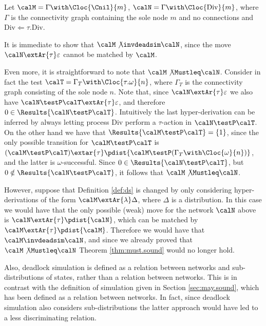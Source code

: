 \documentclass{LMCS}
\begin{document}
\begin{exa}[Divergence]
\label{ex:divergence}
Let $\calM = \Gamma \with \Cloc{\Cnil}{m}$, 
$\calN = \Gamma \with \Cloc{\text{Div}}{m}$, 
where $\Gamma$ is the connectivity graph containing 
the sole node $m$ and no connections and 
$\text{Div} \Leftarrow \tau.\text{Div}$. 

It is immediate to show that $\calM \not\invdeadsim \calN$, 
since the move $\calN \extAr{\tau} \varepsilon$ cannot 
be matched by $\calM$. 

Even more, it is straightforward to 
note that $\calM \not\Mustleq \calN$. Consider in fact the test 
$\calT = \Gamma_T \with \Cloc{\tau.\omega}{n}$,  
where $\Gamma_T$ is the connectivity graph consisting of the 
sole node $n$. Note that, since $\calN \extAr{\tau} \varepsilon$ 
we also have $\calN \testP \calT \extAr{\tau} \varepsilon$, 
and therefore $0 \in \Results{\calN \testP \calT}$. Intuitively 
the last hyper-derivation can be inferred by always letting 
process $\text{Div}$ perform a $\tau$-action in 
$\calN \testP \calT$. On the other hand we have 
that $\Results{\calM \testP \calT} = \{1\}$, since the only possible 
transition for  $\calM \testP \calT$ is 
$(\calM \testP \calT) \extar{\tau} \pdist{\calM \testP (\Gamma_T \with \Cloc{\omega}{n})}$, 
and the latter is $\omega$-successful.  
Since $0 \in \Results{\calN \testP \calT}$, but $0 \notin \Results{\calN \testP \calT}$, 
it follows that $\calM \not\Mustleq \calN$.

However, suppose that Definition \ref{def:ds} is changed 
by only considering hyper-derivations of the form 
$\calM \extAr{\lambda} \Delta$, where $\Delta$ is 
a distribution. 
In this case we would have that the only possible (weak) move 
for the network $\calN$ above is $\calN \extAr{\tau} \pdist{\calN}$, 
which can be matched by $\calM \extAr{\tau} \pdist{\calM}$. 
Therefore we would have that $\calM \invdeadsim \calN$, and 
since we already proved that $\calM \not\Mustleq \calN$ Theorem 
\ref{thm:must.sound} would no longer hold.
\end{exa}

Also, deadlock simulation is defined as a 
relation between networks and sub-distributions of 
states, rather than a relation between networks. 
This is in contrast with the definition of simulation 
given in Section \ref{sec:may.sound}, which 
has been defined as a relation between 
networks.
In fact, since deadlock simulation also considers 
sub-distributions the latter approach would have led to 
a less discriminating relation.
\end{document}
